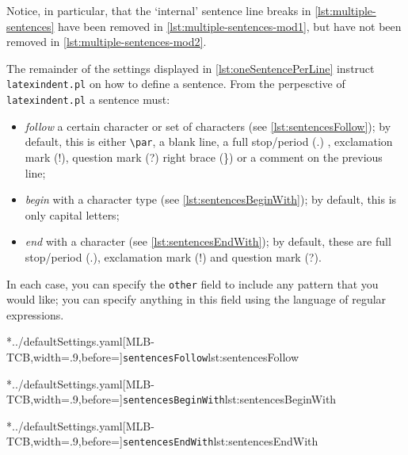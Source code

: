 	Notice, in particular, that the `internal' sentence line breaks in \cref{lst:multiple-sentences} have been removed in \cref{lst:multiple-sentences-mod1}, but have not been removed in \cref{lst:multiple-sentences-mod2}.

	The remainder of the settings displayed in \vref{lst:oneSentencePerLine} instruct \texttt{latexindent.pl} on how to define a sentence.
	From the perpesctive of \texttt{latexindent.pl} a sentence must: \begin{itemize} \item \emph{follow} a certain character or set of characters (see \cref{lst:sentencesFollow}); by default, this is either \lstinline!\par!, a blank line, a full stop/period (.)
		      , exclamation mark (!), question mark (?) right brace (\}) or a comment
		      on the previous line;
		\item \emph{begin} with a character type (see \cref{lst:sentencesBeginWith}); by default, this is only capital letters;
		\item \emph{end} with a character (see \cref{lst:sentencesEndWith}); by default, these are
		      full stop/period (.), exclamation mark (!) and question mark (?).
	\end{itemize}
	In each case, you can specify the \texttt{other} field to include any pattern that you would like; you can specify anything in this field using the language of regular expressions.

	\begin{adjustwidth}{-3.5cm}{-2.5cm}
		\begin{minipage}{.36\linewidth}
			\cmhlistingsfromfile[style=sentencesFollow]*{../defaultSettings.yaml}[MLB-TCB,width=.9\linewidth,before=\centering]{\texttt{sentencesFollow}}{lst:sentencesFollow}
		\end{minipage}
		\hfill
		\begin{minipage}{.31\linewidth}
			\cmhlistingsfromfile[style=sentencesBeginWith]*{../defaultSettings.yaml}[MLB-TCB,width=.9\linewidth,before=\centering]{\texttt{sentencesBeginWith}}{lst:sentencesBeginWith}
		\end{minipage}
		\hfill
		\begin{minipage}{.31\linewidth}
			\cmhlistingsfromfile[style=sentencesEndWith]*{../defaultSettings.yaml}[MLB-TCB,width=.9\linewidth,before=\centering]{\texttt{sentencesEndWith}}{lst:sentencesEndWith}
		\end{minipage}
	\end{adjustwidth}

